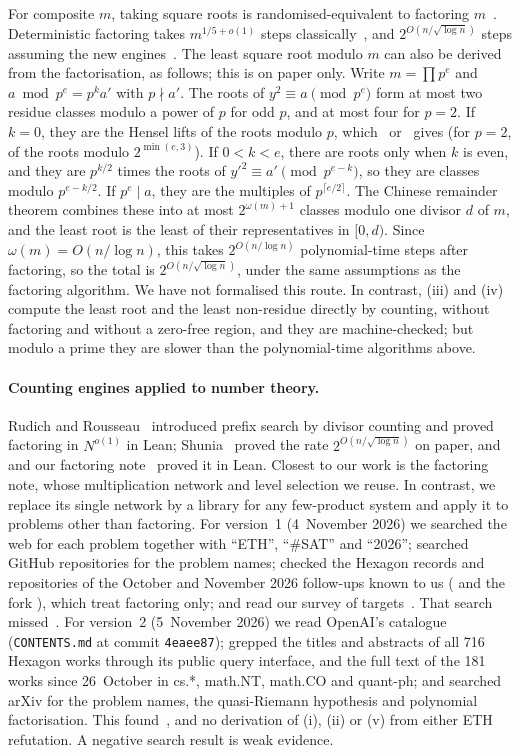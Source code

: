 \documentclass[10pt]{amsart}
\theoremstyle{plain}
\theoremstyle{definition}
\theoremstyle{remark}
\numberwithin{equation}{section}
\newcommand{\rate}{2^{O(n/\sqrt{\log n})}}
\begin{document}
For composite $m$, taking square roots is randomised-equivalent to factoring $m$~\cite{Rab79}.
Deterministic factoring takes $m^{1/5+o(1)}$ steps classically~\cite{Har21}, and $\rate$ steps assuming the
new engines~\cite{RR26,Shu26,TulFac26}. The least square root modulo $m$ can also be derived from the
factorisation, as follows; this is on paper only. Write $m=\prod p^e$ and $a\bmod p^e=p^ka'$ with
$p\nmid a'$. The roots of $y^2\equiv a\pmod{p^e}$ form at most two residue classes modulo a power of $p$ for
odd $p$, and at most four for $p=2$. If $k=0$, they are the Hensel lifts of the roots modulo $p$, which~\cite{OAI003}
or~\cite{OAI142} gives (for $p=2$, of the roots modulo $2^{\min(e,3)}$). If $0<k<e$, there are roots only when $k$ is even,
and they are $p^{k/2}$ times the roots of $y'^2\equiv a'\pmod{p^{e-k}}$, so they are classes modulo
$p^{e-k/2}$. If $p^e\mid a$, they are the multiples of $p^{\lceil e/2\rceil}$. The Chinese remainder theorem
combines these into at most $2^{\omega(m)+1}$ classes modulo one divisor $d$ of $m$, and the least root is
the least of their representatives in $[0,d)$. Since $\omega(m)=O(n/\log n)$, this takes $2^{O(n/\log n)}$
polynomial-time steps after factoring, so the total is $\rate$, under the same assumptions as the factoring
algorithm. We have not formalised this route. In contrast, (iii) and (iv) compute the least root and the
least non-residue directly by counting, without factoring and without a zero-free region, and they are
machine-checked; but modulo a prime they are slower than the polynomial-time algorithms above.

\paragraph{Counting engines applied to number theory.} Rudich and Rousseau~\cite{RR26} introduced prefix
search by divisor counting and proved factoring in $N^{o(1)}$ in Lean; Shunia~\cite{Shu26} proved the rate
$\rate$ on paper, and~\cite{IF26} and our factoring note~\cite{TulFac26} proved it in Lean. Closest to our
work is the factoring note, whose multiplication network and level selection we reuse. In contrast, we
replace its single network by a library for any few-product system and apply it to problems other than
factoring. For version~1 (4~November 2026) we searched the web for each problem together with ``ETH'',
``$\#$SAT'' and ``2026''; searched GitHub repositories for the problem names; checked the Hexagon records
and repositories of the October and November 2026 follow-ups known to us (\cite{RR26,Shu26,IF26} and the
fork ), which treat factoring only; and read our survey of
targets~\cite{TulsyanRepo26}. That search missed~\cite{OAI003,OAI142}. For version~2 (5~November 2026) we
read OpenAI's catalogue (\texttt{CONTENTS.md} at commit \texttt{4eaee87}); grepped the titles and abstracts
of all 716 Hexagon works through its public query interface, and the full text of the 181 works since
26~October in cs.*, math.NT, math.CO and quant-ph; and searched arXiv for the problem names, the
quasi-Riemann hypothesis and polynomial factorisation. This found~\cite{OAI003,OAI142,FSW26,Vega26}, and no
derivation of (i), (ii) or (v) from either ETH refutation. A negative search result is weak evidence.
\end{document}
